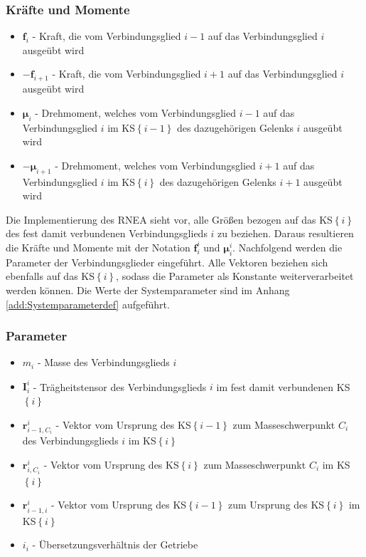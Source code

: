 \subsubsection*{Kräfte und Momente}
\begin{itemize}
	\item $ \boldsymbol{f}_i $ - Kraft, die vom Verbindungsglied $ i-1 $ auf das Verbindungsglied $ i $ ausgeübt wird
	\item $ -\boldsymbol{f}_{i+1} $ - Kraft, die vom Verbindungsglied $ i+1 $ auf das Verbindungsglied $ i $ ausgeübt wird
	\item $ \boldsymbol{\mu}_i $ - Drehmoment, welches vom Verbindungsglied $ i-1 $ auf das Verbindungsglied $ i $ im KS$\left\{i-1\right\}$ des dazugehörigen Gelenks $i$ ausgeübt wird
	\item $ -\boldsymbol{\mu}_{i+1} $ - Drehmoment, welches vom Verbindungsglied $ i+1 $ auf das Verbindungsglied $ i $ im KS$\left\{i\right\}$ des dazugehörigen Gelenks $i+1$ ausgeübt wird
\end{itemize}
%
Die Implementierung des RNEA sieht vor, alle Größen bezogen auf das KS$\left\{i\right\}$ des fest damit verbundenen Verbindungsglieds $i$ zu beziehen. Daraus resultieren die Kräfte und Momente mit der Notation $ \boldsymbol{f}_{i}^{i} $ und $ \boldsymbol{\mu}_i^{i} $. Nachfolgend werden die Parameter der Verbindungsglieder eingeführt. Alle Vektoren beziehen sich ebenfalls auf das KS$\left\{i\right\}$, sodass die Parameter als Konstante weiterverarbeitet werden können. Die Werte der Systemparameter sind im Anhang \ref{add:Systemparameterdef} aufgeführt.
%
\subsubsection*{Parameter}
\begin{itemize}
	\item $ m_i $ - Masse des Verbindungsglieds $i$
	\item $ \bm{I}^{i}_{i} $ - Trägheitstensor des Verbindungsglieds $i$ im fest damit verbundenen KS$\left\{i\right\}$ 
	\item $ \boldsymbol{r}^{i}_{i-1,C_i} $ - Vektor vom Ursprung des KS$\left\{i-1\right\}$ zum Masseschwerpunkt $ C_i $ des Verbindungsglieds $i$ im KS$\left\{i\right\}$ 
	\item $ \boldsymbol{r}^{i}_{i,C_i} $ - Vektor vom Ursprung des KS$\left\{i\right\}$ zum Masseschwerpunkt $ C_i $ im KS$\left\{i\right\}$ 
	\item $ \boldsymbol{r}^{i}_{i-1,i} $ - Vektor vom Ursprung des KS$\left\{i-1\right\}$ zum Ursprung des  KS$\left\{i\right\}$ im KS$\left\{i\right\}$ 
	\item $ i_i$ - Übersetzungsverhältnis der Getriebe
\end{itemize}
%
